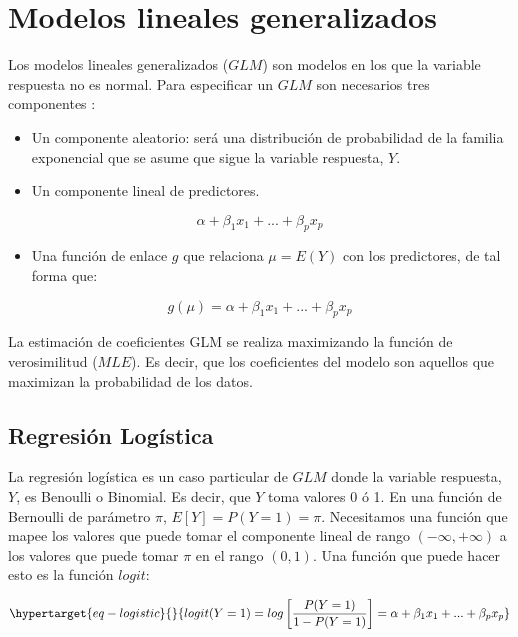 \documentclass[
  12pt,
  a4paper,
  extrafontsizes,
  onecolumn,
  openright]{memoir}
\providecommand{\tightlist}{%
  \setlength{\itemsep}{0pt}\setlength{\parskip}{0pt}}\usepackage{longtable,booktabs,array}
\begin{document}
\hypertarget{sec-glm}{%
\section{Modelos lineales generalizados}\label{sec-glm}}

Los modelos lineales generalizados (\(GLM\)) son modelos en los que la
variable respuesta no es normal. Para especificar un \(GLM\) son
necesarios tres componentes \autocite[ver][pp.~66-67]{agresti_2018}:

\begin{itemize}
\tightlist
\item
  Un componente aleatorio: será una distribución de probabilidad de la
  familia exponencial que se asume que sigue la variable respuesta,
  \(Y\).
\item
  Un componente lineal de predictores.
\end{itemize}

\[
\alpha+\beta_1x_1+...+\beta_px_p
\]

\begin{itemize}
\tightlist
\item
  Una función de enlace \(g\) que relaciona \(\mu=E(Y)\) con los
  predictores, de tal forma que:
\end{itemize}

\[
g(\mu)=\alpha+\beta_1x_1+...+\beta_px_p
\]

La estimación de coeficientes GLM se realiza maximizando la función de
verosimilitud (\(MLE\)). Es decir, que los coeficientes del modelo son
aquellos que maximizan la probabilidad de los datos.

\hypertarget{sec-logistica}{%
\subsection{Regresión Logística}\label{sec-logistica}}

La regresión logística \autocite[ver][pp.~68-69]{agresti_2018} es un
caso particular de \(GLM\) donde la variable respuesta, \(Y\), es
Benoulli o Binomial. Es decir, que \(Y\) toma valores 0 ó 1. En una
función de Bernoulli de parámetro \(\pi\), \(E[Y] = P(Y=1) = \pi\).
Necesitamos una función que mapee los valores que puede tomar el
componente lineal de rango \((-\infty, +\infty)\) a los valores que
puede tomar \(\pi\) en el rango \((0, 1)\). Una función que puede hacer
esto es la función \(logit\):

\begin{equation}\protect\hypertarget{eq-logistic}{}{
logit(Y=1) = log \left[\frac{P(Y=1)}{1-P(Y=1)} \right] = \alpha+\beta_1x_1+...+\beta_px_p
}\label{eq-logistic}\end{equation}
\end{document}
